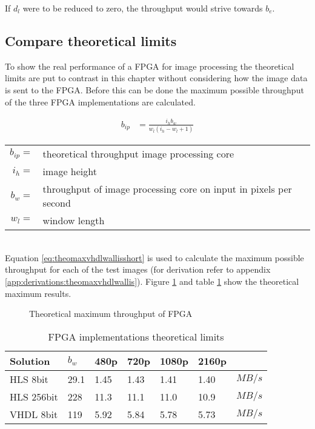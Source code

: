 If $d_l$ were to be reduced to zero, the throughput would strive towards $b_e$.

\subsection{Compare theoretical limits}
To show the real performance of a FPGA for image processing the theoretical
limits are put to contrast in this chapter without considering how the image
data is sent to the FPGA.
Before this can be done the maximum possible throughput of the three FPGA
implementations are calculated.

\begin{align}
    b_{ip}  & = \frac{i_hb_w}{w_l (i_h-w_l+1)}
    \label{eq:theomaxvhdlwallisshort}
\end{align}

\begin{tabular}{rl}
    $b_{ip}=$ & theoretical throughput image processing core \\
    $i_h   =$ & image height \\
    $b_w   =$ & throughput of image processing core on input in pixels per
    second \\
    $w_l   =$ & window length \\
\end{tabular} \\

Equation \ref{eq:theomaxvhdlwallisshort} is used to calculate the maximum
possible throughput for each of the test images (for derivation refer to
appendix \ref{app:derivations:theomaxvhdlwallis}). Figure \ref{fig:theoresults}
and table \ref{tab:FPGAimplementationstheoreticallimits} show the theoretical
maximum results.

\begin{figure}[b!]
    \centering
    \begin{adjustbox}{max width=\linewidth}
        
    \end{adjustbox}
    \caption{Theoretical maximum throughput of FPGA}
    \label{fig:theoresults}
\end{figure}

\begin{table}[b!]
    \centering
    \begin{tabular}{l l l l l l l}
        \toprule
        Solution & $b_w$ & 480p & 720p & 1080p & 2160p & \\
        \midrule
        HLS  8bit       & 29.1 & 1.45 & 1.43 & 1.41 & 1.40 & $MB/s$\\
        HLS  256bit     & 228  & 11.3 & 11.1 & 11.0 & 10.9 & $MB/s$\\
        VHDL 8bit          & 119  & 5.92 & 5.84 & 5.78 & 5.73 & $MB/s$\\
        \bottomrule
    \end{tabular}
    \caption{FPGA implementations theoretical limits}
    \label{tab:FPGAimplementationstheoreticallimits}
\end{table}


